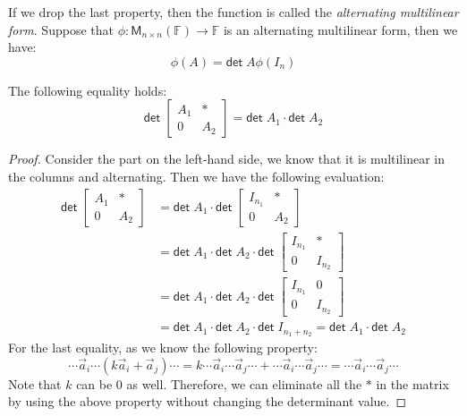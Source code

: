 \documentclass[
	11pt, %
	fleqn, %
	a4paper, %
]{LegrandOrangeBook}
\newcommand{\F}{\mathbb{F}} %
\newcommand{\M}[2]{\mathsf{M}_{#1}(#2)} %
\renewcommand{\det}{\mathsf{det\;}} %
\begin{document}
If we drop the last property, then the function is called the \emph{alternating multilinear form}. Suppose that $\phi : \M{n \times n}{\F} \to \F$ is an alternating multilinear form, then we have:
\[
    \phi(A) = \det A \phi(I_n)
\]

\begin{proposition}
    The following equality holds:
    \[
        \det \begin{bmatrix}
            A_1 & * \\
            0 & A_2
        \end{bmatrix} = \det A_1 \cdot \det A_2
    \]
\end{proposition}
\begin{proof}
    Consider the part on the left-hand side, we know that it is multilinear in the columns and alternating. Then we have the following evaluation:
    \[
        \begin{split}
            \det \begin{bmatrix}
                A_1 & * \\
                0 & A_2
            \end{bmatrix} & = \det A_1 \cdot \det \begin{bmatrix}
                I_{n_1} & * \\
                0 & A_2
            \end{bmatrix} \\
            & = \det A_1 \cdot \det A_2 \cdot \det \begin{bmatrix}
                I_{n_1} & * \\
                0 & I_{n_2}
            \end{bmatrix} \\
            & = \det A_1 \cdot \det A_2 \cdot \det \begin{bmatrix}
                I_{n_1} & 0 \\
                0 & I_{n_2}
            \end{bmatrix} \\
            & = \det A_1 \cdot \det A_2 \cdot \det I_{n_1 + n_2} = \det A_1 \cdot \det A_2
        \end{split}
    \]
    For the last equality, as we know the following property:
    \[
        \cdots \vec{a}_i \cdots (k\vec{a}_i + \vec{a}_j) \cdots = k \cdots \vec{a}_i \cdots \vec{a}_j \cdots + \cdots \vec{a}_i \cdots \vec{a}_j \cdots = \cdots \vec{a}_i \cdots \vec{a}_j \cdots
    \]
    Note that $k$ can be 0 as well. Therefore, we can eliminate all the $*$ in the matrix by using the above property without changing the determinant value.
\end{proof}
\end{document}
